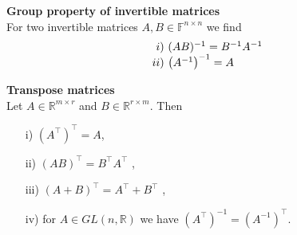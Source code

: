 {\textbf{Group property of invertible matrices}\\
For two invertible matrices $A,B \in \mathbb{F}^{n\times n}$ we find 
\begin{eqnarray*}
    \begin{array}{r@{~}l} 
        i)    & (AB)^{-1} = B^{-1} A^{-1} \\ 
        ii)  & \left(A^{-1}\right)^{-1} = A \\ 
    \end{array}  
\end{eqnarray*} 


\textbf{Transpose matrices}\\
Let $A\in\mathbb{R}^{m\times r}$ and $B\in\mathbb{R}^{r\times m}$. Then
\begin{itemize}
	\item[i)] $(A^\top)^\top =A$,
	\item[ii)] $(AB)^\top=B^\top A^\top$ ,
	\item[iii)] $(A+B)^\top= A^\top + B^\top$ ,
	\item[iv)] for $A\in GL(n,\mathbb{R})$ we have $(A^{\top})^{-1}=(A^{-1})^{\top}$.
\end{itemize}
}